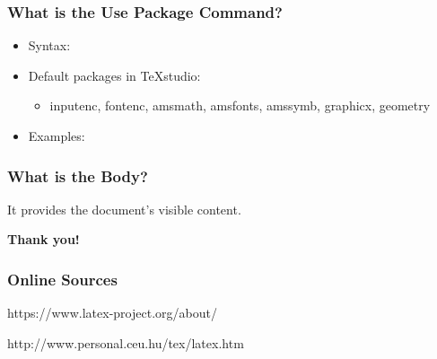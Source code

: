 \documentclass[17pt]{beamer}
\begin{document}
	\begin{frame}
		\frametitle{What is the Use Package Command?}
		
		\begin{itemize}
			
			\item Syntax: \begin{minipage}[m]{0.6\textwidth}
				
			\end{minipage}
			\item \pause Default packages in TeXstudio:
			\begin{itemize}
				\item inputenc,
				 fontenc,
				 amsmath,
				 amsfonts,
				 amssymb,
				 graphicx,
				 geometry
			\end{itemize}
			
			\item \pause Examples: 
		\end{itemize}
	\end{frame}	
	
	\begin{frame}
		\frametitle{What is the Body?}
		
		
		
		It provides the document's visible content.
	\end{frame}	

    \begin{frame}
    	\begin{center}
    		\textbf{\LARGE Thank you!}
    	\end{center}
    \end{frame}

	\begin{frame}
		\frametitle{Online Sources}
		https://www.latex-project.org/about/
		
		http://www.personal.ceu.hu/tex/latex.htm
	\end{frame}	
	
\end{document}
